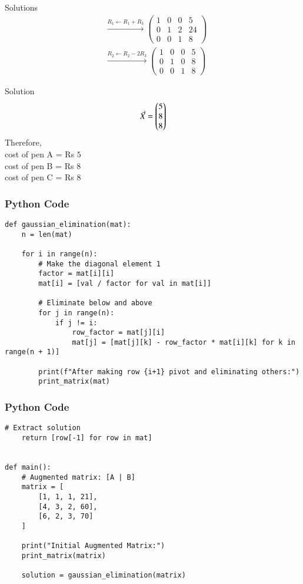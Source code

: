 \documentclass{beamer}
\begin{document}
\begin{frame}{Solutions}
\begin{align}
&\xrightarrow{R_1 \gets R_1 + R_3}
\left(
\begin{array}{ccc|c}
1 & 0 & 0 & 5 \\
0 & 1 & 2 & 24 \\
0 & 0 & 1 & 8
\end{array}
\right) \\[12pt]
&\xrightarrow{R_2 \gets R_2 - 2R_3}
\left(
\begin{array}{ccc|c}
1 & 0 & 0 & 5 \\
0 & 1 & 0 & 8 \\
0 & 0 & 1 & 8
\end{array}
\right)
\end{align} 
\end{frame}
\begin{frame}{Solution}
\begin{align}
     \Vec{X}=\begin{pmatrix}5
                   \\
                    8
                   \\
                   8\end{pmatrix}
\end{align}
    Therefore,\\
          cost of pen A = Rs $5$\\
          cost of pen B = Rs $8$\\
          cost of pen C = Rs $8$
\end{frame}

\begin{frame}[fragile]
    \frametitle{Python Code}
    \begin{lstlisting}
def gaussian_elimination(mat):
    n = len(mat)

    for i in range(n):
        # Make the diagonal element 1
        factor = mat[i][i]
        mat[i] = [val / factor for val in mat[i]]

        # Eliminate below and above
        for j in range(n):
            if j != i:
                row_factor = mat[j][i]
                mat[j] = [mat[j][k] - row_factor * mat[i][k] for k in range(n + 1)]

        print(f"After making row {i+1} pivot and eliminating others:")
        print_matrix(mat)

\end{lstlisting}
\end{frame}

\begin{frame}[fragile]
    \frametitle{Python Code}

    \begin{lstlisting}
# Extract solution
    return [row[-1] for row in mat]


def main():
    # Augmented matrix: [A | B]
    matrix = [
        [1, 1, 1, 21],
        [4, 3, 2, 60],
        [6, 2, 3, 70]
    ]

    print("Initial Augmented Matrix:")
    print_matrix(matrix)

    solution = gaussian_elimination(matrix)


    \end{lstlisting}
\end{frame}
\end{document}
